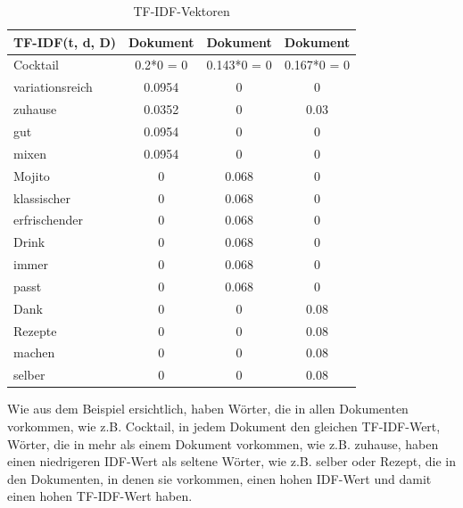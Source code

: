 \begin{table}[H]
    \centering
    \begin{tabular}{l|c|c|c}
        TF-IDF(t, d, D)          & Dokument \textnumero 1 & Dokument \textnumero 2 & Dokument \textnumero 3 \\
        \hline
        Cocktail            & 0.2*0 = 0             & 0.143*0 = 0      & 0.167*0 = 0 \\
        \hline
        variationsreich & 0.0954             & 0 & 0      \\
        \hline
        zuhause                & 0.0352           & 0    & 0.03 \\
        \hline
        gut                  & 0.0954             & 0      & 0  \\
        \hline
        mixen            & 0.0954             & 0      & 0 \\
        \hline
        Mojito & 0             & 0.068 & 0      \\
        \hline
        klassischer                & 0           & 0.068    & 0 \\
        \hline
        erfrischender                  & 0             & 0.068      & 0   \\
        \hline
        Drink            & 0             & 0.068      & 0 \\
        \hline
        immer & 0             & 0.068 & 0      \\
        \hline
        passt                & 0          & 0.068    & 0 \\
        \hline
        Dank                  & 0             & 0      & 0.08   \\
        \hline
        Rezepte            & 0             & 0      & 0.08 \\
        \hline
        machen & 0             & 0 & 0.08      \\
        \hline
        selber                & 0           & 0    & 0.08\\
    \end{tabular}
    \caption{\label{table:TFIDF_Vektoren}\ac{TF-IDF}-Vektoren}
\end{table}
\noindent
Wie aus dem Beispiel ersichtlich, haben Wörter, die in allen Dokumenten vorkommen, wie z.B. \glqq Cocktail\grqq{}, in jedem Dokument den gleichen \ac{TF-IDF}-Wert, Wörter, die in mehr als einem Dokument vorkommen, wie z.B. \glqq zuhause\grqq{}, haben einen niedrigeren \ac{IDF}-Wert als seltene Wörter, wie z.B. \glqq selber\grqq{} oder \glqq{}Rezept\grqq{}, die in den Dokumenten, in denen sie vorkommen, einen hohen \ac{IDF}-Wert und damit einen hohen \ac{TF-IDF}-Wert haben. 
